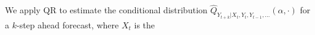 We apply QR to estimate the conditional distribution $\hat{Q}_{Y_{t+k}|X_t,Y_t, Y_{t-1}, \dots} (\alpha,\cdot)$ for a $k$-step ahead forecast, where $X_t$ is the  
%
%
%
%
%
%
%	
%	
%	
%	
%	
%	
